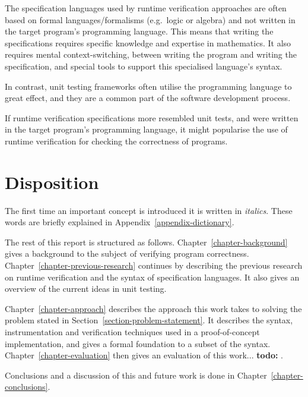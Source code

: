 \documentclass[a4paper,11pt]{kth-mag}
\newcommand{\todo}[1]{\textbf{todo: #1}}
\begin{document}
The specification languages used by runtime verification approaches are often
based on formal languages/formalisms (e.g.\ logic or algebra) and not written
in the target program's programming language. This means that writing the
specifications requires specific knowledge and expertise in mathematics. It
also requires mental context-switching, between writing the program and writing
the specification, and special tools to support this specialised language's
syntax.

In contrast, unit testing frameworks often utilise the programming language to
great effect, and they are a common part of the software development process.

If runtime verification specifications more resembled unit tests, and were
written in the target program's programming language, it might popularise the
use of runtime verification for checking the correctness of programs.



\section{Disposition}

The first time an important concept is introduced it is written in
\textit{italics}. These words are briefly explained in
Appendix~\ref{appendix-dictionary}.

The rest of this report is structured as follows.
Chapter~\ref{chapter-background} gives a
background to the subject of verifying program correctness.
Chapter~\ref{chapter-previous-research} continues
by describing the previous research on runtime verification and the syntax of
specification languages. It also gives an overview of the current ideas in unit
testing.

Chapter~\ref{chapter-approach} describes the approach this work takes to
solving the problem stated in Section~\ref{section-problem-statement}. It
describes the syntax, instrumentation and verification techniques used in a
proof-of-concept implementation, and gives a formal foundation to a subset of
the syntax. Chapter~\ref{chapter-evaluation} then gives an evaluation of this
work...
\todo{}.

Conclusions and a discussion of this and future work is done in
Chapter~\ref{chapter-conclusions}.





\end{document}
